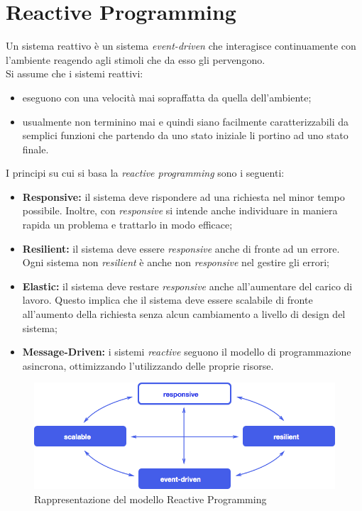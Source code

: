 

\chapter{Reactive Programming}
Un sistema reattivo è un sistema \textit{event-driven} che interagisce continuamente con l'ambiente reagendo agli stimoli che da esso gli pervengono.\\
Si assume che i sistemi reattivi:
\begin{itemize}
	\item eseguono con una velocità mai sopraffatta da quella dell'ambiente;
	\item usualmente non terminino mai e quindi siano facilmente caratterizzabili da semplici funzioni che partendo da uno stato iniziale li portino ad uno stato finale.
\end{itemize}
I principi su cui si basa la \textit{reactive programming} sono i seguenti:
\begin{itemize}
	\item \textbf{Responsive:} il sistema deve rispondere ad una richiesta nel minor tempo possibile. Inoltre, con \textit{responsive} si intende anche individuare in maniera rapida un problema e trattarlo in modo efficace;
	\item \textbf{Resilient:} il sistema deve essere \textit{responsive} anche di fronte ad un errore. Ogni sistema non \textit{resilient} è anche non \textit{responsive} nel gestire gli errori;
	\item \textbf{Elastic:} il sistema deve restare \textit{responsive} anche all'aumentare del carico di lavoro. Questo implica che il sistema deve essere scalabile di fronte all'aumento della richiesta senza alcun cambiamento a livello di design del sistema;
	\item \textbf{Message-Driven:} i sistemi \textit{reactive} seguono il modello di programmazione asincrona, ottimizzando l'utilizzando delle proprie risorse.
\end{itemize}
\begin{figure}[h]
\centering
\includegraphics[width=0.7\linewidth]{immagini/react}
\caption[Rappresentazione del modello Reactive Programming]{Rappresentazione del modello Reactive Programming}
\label{fig:react}
\end{figure}

